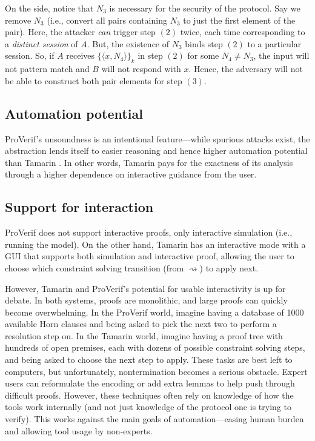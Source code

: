 \documentclass{article}
\theoremstyle{definition}
\begin{document}
On the side, notice that $N_3$ is necessary for the security of the protocol. Say we remove $N_3$ (i.e., convert all pairs containing $N_3$ to just the first element of the pair). Here, the attacker \textit{can} trigger step $(2)$ twice, each time corresponding to a \textit{distinct session} of $A$. But, the existence of $N_3$ binds step $(2)$ to a particular session. So, if $A$ receives $\{\langle x, N_4 \rangle\}_k$ in step $(2)$ for some $N_4 \neq N_3$, the input will not pattern match and $B$ will not respond with $x$. Hence, the adversary will not be able to construct both pair elements for step $(3)$.

\subsection{Automation potential}
ProVerif's unsoundness is an intentional feature---while spurious attacks exist, the abstraction lends itself to easier reasoning and hence higher automation potential than Tamarin \cite{proverif_automation}. In other words, Tamarin pays for the exactness of its analysis through a higher dependence on interactive guidance from the user.

\subsection{Support for interaction}

ProVerif does not support interactive proofs, 
only interactive simulation (i.e., running the model). 
On the other hand, Tamarin has an interactive mode with a GUI that supports both simulation and interactive proof, allowing the user to choose which constraint solving transition (from $\rightsquigarrow$) to apply next. 

However, Tamarin and ProVerif's potential for usable interactivity is up for debate.
In both systems, proofs are monolithic, and large proofs can quickly become overwhelming. 
In the ProVerif world, imagine having a database of 1000 available Horn clauses 
and being asked to pick the next two to perform a resolution step on. 
In the Tamarin world, imagine having a proof tree with hundreds of open premises, 
each with dozens of possible constraint solving steps, 
and being asked to choose the next step to apply. 
These tasks are best left to computers, but unfortunately, nontermination becomes a serious obstacle. 
Expert users can reformulate the encoding or add extra lemmas to help push through difficult proofs. 
However, these techniques often rely on knowledge of how the tools work internally 
(and not just knowledge of the protocol one is trying to verify).
This works against the main goals of automation---easing human burden and allowing tool usage by non-experts. 
\end{document}
